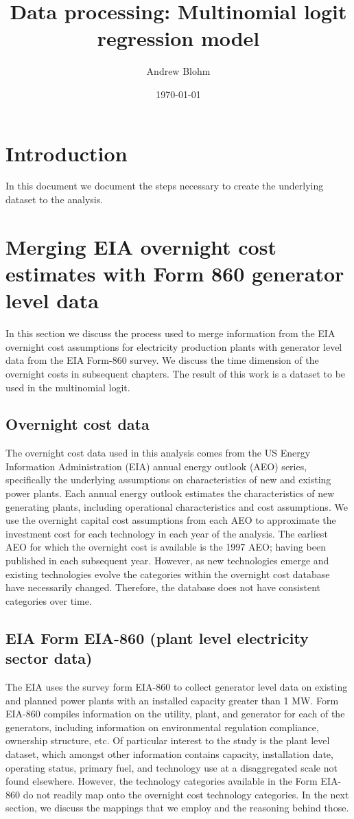 \documentclass[10pt]{report}
\title{Data processing: Multinomial logit regression model}
\author{Andrew Blohm}
\date{\today}
\begin{document}
\maketitle

\chapter{Introduction}
In this document we document the steps necessary to create the underlying dataset to the analysis. 

\chapter{Merging EIA overnight cost estimates with Form 860 generator level data}
In this section we discuss the process used to merge information from the EIA overnight cost assumptions for electricity production plants with generator level data from the EIA Form-860 survey.  
We discuss the time dimension of the overnight costs in subsequent chapters. 
The result of this work is a dataset to be used in the multinomial logit.

\section{Overnight cost data}
The overnight cost data used in this analysis comes from the US Energy Information Administration (EIA) annual energy outlook (AEO) series, specifically the underlying assumptions on characteristics of new and existing power plants. 
Each annual energy outlook estimates the characteristics of new generating plants, including operational characteristics and cost assumptions.
We use the overnight capital cost assumptions from each AEO to approximate the investment cost for each technology in each year of the analysis.
The earliest AEO for which the overnight cost is available is the 1997 AEO; having been published in each subsequent year.
However, as new technologies emerge and existing technologies evolve the categories within the overnight cost database have necessarily changed. 
Therefore, the database does not have consistent categories over time. 

\section{EIA Form EIA-860 (plant level electricity sector data)}
The EIA uses the survey form EIA-860 to collect generator level data on existing and planned power plants with an installed capacity greater than 1 MW. 
Form EIA-860 compiles information on the utility, plant, and generator for each of the generators, including information on environmental regulation compliance, ownership structure, etc.  
Of particular interest to the study is the plant level dataset, which amongst other information contains capacity, installation date, operating status, primary fuel, and technology use at a disaggregated scale not found elsewhere.
However, the technology categories available in the Form EIA-860 do not readily map onto the overnight cost technology categories. 
In the next section, we discuss the mappings that we employ and the reasoning behind those. 
\end{document}
